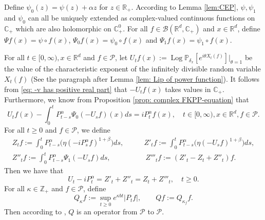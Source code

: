 \documentclass[EJP]{ejpecp} %
\begin{document}
	Define $\psi_0(z) = \psi(z) + \alpha z$ for $z\in \mathbb{R}_+$.
	According to Lemma \ref{lem:CEP}, $\psi, \psi_1$ and $\psi_0$ can all be uniquely extended as complex-valued continuous functions on $\mathbb C_+$ which are also holomorphic on $\mathbb C^0_+$.
	For all $f\in \mathcal B(\mathbb R^d, \mathbb C_+)$ and $x\in \mathbb R^d$, define $\Psi f (x) = \psi\circ f(x)$, $\Psi_0 f(x)= \psi_0 \circ f(x)$ and $\Psi_1 f(x)= \psi_1 \circ f(x)$.

	For all $t\in [0,\infty), x\in \mathbb R^d $ and $f \in \mathcal{P}$, let $ U_tf(x) := \operatorname{Log} \mathbb P_{\delta_x}[e^{i\theta X_t(f)}]|_{\theta = 1} $ be the value of the characteristic exponent of the infinitely divisible random variable $X_t(f)$ (See the paragraph after Lemma \ref{lem: Lip of power function}).
	It follows from \eqref{eq: -v has positive real part} that $-U_tf(x)$ takes values in $\mathbb C_+$. Furthermore, we know from Proposition \ref{prop: complex FKPP-equation} that
\begin{equation}
\label{eq:chareq2}
  	U_tf(x) - \int_0^t P^\alpha_{t-s} \Psi_0(-U_sf)(x)ds
  	= i P^{\alpha}_t f(x), 
  	\quad t\in [0,\infty), x\in \mathbb{R}^d, f\in \mathcal P.
\end{equation}
%
	For all $t\geq 0$ and $f\in \mathcal P$, we define
\begin{align}
\label{eq: def of Zf}
  	Z_t f
  	:= \int_0^t P^\alpha_{t-s}\big( \eta (-i P^\alpha_sf)^{1+\beta}\big)ds,
  	& \qquad Z'_t f
    := \int_0^t P^\alpha_{t-s}\big( \eta (-U_s f)^{1+\beta}\big)ds,
  	\\ Z''_t f
  	:= \int_0^t P^\alpha_{t-s}\Psi_1(-U_s f)ds,
  	& \qquad\  Z'''_t f
    := (Z'_t - Z_t+ Z''_t)f.
\end{align}
	Then we have that
\begin{equation}
\label{eq: key equality}
  	U_t - i P^\alpha_t
  	= Z'_t + Z''_t
  	= Z_t + Z'''_t, 
  	\quad t\geq 0.
\end{equation}
	For all $\kappa \in \mathbb Z_+$ and $f\in \mathcal P$, define
\begin{equation}
\label{eq:Q}
  	Q_\kappa f
  	:= \sup_{t\geq 0} e^{\kappa b t}|P_t f|,
  	\qquad  Q f
  	:= Q_{\kappa_f}f.
\end{equation}
	Then according to \cite[Fact 1.2]{MarksMilos2018CLT}, $Q$ is an operator from $\mathcal P$ to $\mathcal P$.
\end{document}
